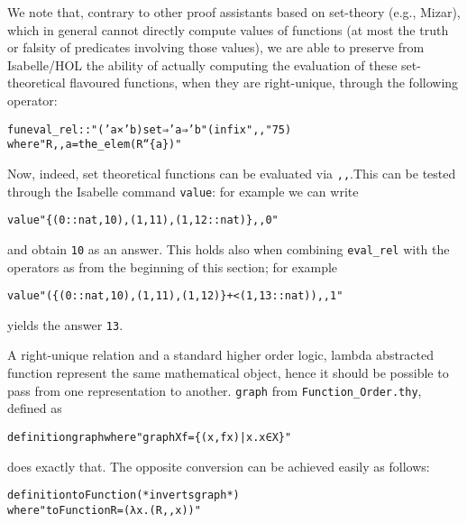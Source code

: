\documentclass[
]{llncs}
\newenvironment{mytable}{
\vspace{0.2ex}
\begin{center}\begin{minipage}
{0.9\textwidth}\renewcommand{\baselinestretch}{0.75}\begin{small}}
{\end{small}\end{minipage}\end{center}
\vspace{0.1ex}
}
\newcommand{\hol}{higher order logic}
\newcommand{\I}{Isabelle}
\newcommand{\M}{Mizar}
\begin{document}
We note that, contrary to other proof assistants based on set-theory (e.g., \M{}), which in general cannot directly compute values of functions (at most the truth or falsity of predicates involving those values), we are able to preserve from \I{}/HOL the ability of actually computing the evaluation of these set-theoretical flavoured functions, when they are right-unique, through the following operator:
\begin{mytable}
\begin{alltt}
fun eval_rel :: "('a × 'b) set ⇒ 'a ⇒ 'b" (infix ",," 75)
where "R ,, a = the_elem (R `` \{a\})"
\end{alltt}\end{mytable}
Now, indeed, set theoretical functions can be evaluated via \verb|,,|.This can be tested through the \I{} command \verb|value|: for example we can write
\begin{mytable}
\begin{alltt}
value "\{(0::nat,10),(1,11),(1,12::nat)\} ,, 0"
\end{alltt}
\end{mytable}
and obtain \verb!10! as an answer.
This holds also when combining \verb|eval_rel| with the operators as from the beginning of this section; for example
\begin{mytable}
\begin{alltt}
value "(\{(0::nat,10),(1,11),(1,12)\} +< (1,13::nat)) ,, 1"
\end{alltt}
\end{mytable}
yields the answer \verb|13|.

A right-unique relation and a standard \hol{}, lambda abstracted function represent the same mathematical object, hence it should be possible to pass from one representation to another. 
\verb|graph| from \verb|Function_Order.thy|, defined as
\begin{mytable}
\begin{alltt}
definition graph where "graph X f = \{(x, f x) | x. x ∈ X\}" 
\end{alltt}
\end{mytable}
does exactly that. 
The opposite conversion can be achieved easily as follows:
\begin{mytable}
\begin{alltt}
definition toFunction (* inverts graph *)
where "toFunction R = (λ x . (R ,, x))"
\end{alltt}
\end{mytable}
\end{document}
